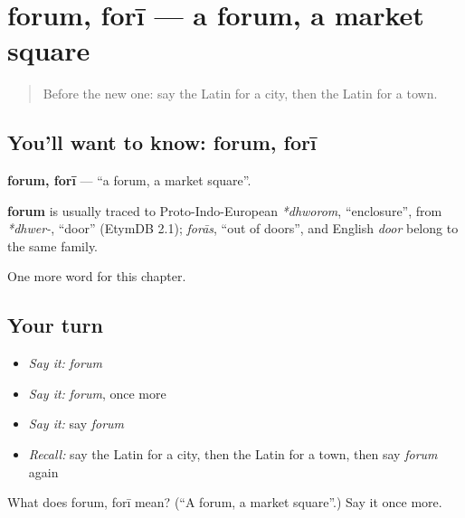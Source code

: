 \section[forum, forī]{forum, forī — a forum, a market square}

\label{lesson:LA-C107-forum}



\begin{quote}
Before the new one: say the Latin for a city, then the Latin for a town.
\end{quote}

\subsection*{You'll want to know: forum, forī}
\textbf{forum, forī} — \textquotedblleft{}a forum, a market square\textquotedblright{}.

\begin{cousinweb}
\textbf{forum} is usually traced to Proto-Indo-European \emph{*dhworom}, \textquotedblleft{}enclosure\textquotedblright{}, from \emph{*dhwer-}, \textquotedblleft{}door\textquotedblright{} (EtymDB 2.1); \emph{forās}, \textquotedblleft{}out of doors\textquotedblright{}, and English \emph{door} belong to the same family.
\end{cousinweb}

\begin{grammarlens}[title={What you've built}]
One more word for this chapter.
\end{grammarlens}

\subsection*{Your turn}
\begin{itemize}
\raggedright
  \item \emph{Say it:} \emph{forum}
  \item \emph{Say it:} \emph{forum}, once more
  \item \emph{Say it:} say \emph{forum}
  \item \emph{Recall:} say the Latin for a city, then the Latin for a town, then say \emph{forum} again
\end{itemize}

\begin{tcolorbox}[breakable,colback=teal!4,colframe=teal!35!black,title={Before you move on}]
What does forum, forī mean? (\textquotedblleft{}A forum, a market square\textquotedblright{}.) Say it once more.
\end{tcolorbox}
